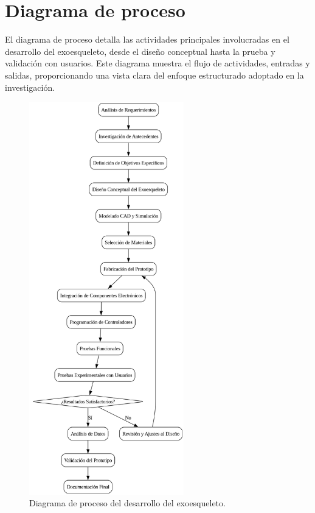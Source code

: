 \section{Diagrama de proceso}
El diagrama de proceso detalla las actividades principales involucradas en el desarrollo del exoesqueleto, desde el diseño conceptual hasta la prueba y validación con usuarios. Este diagrama muestra el flujo de actividades, entradas y salidas, proporcionando una vista clara del enfoque estructurado adoptado en la investigación.
\begin{figure}[H]
    \centering
    \includegraphics[width=0.6\textwidth]{img/Proceso.png}
    \caption{Diagrama de proceso del desarrollo del exoesqueleto.}
    \label{fig:flowchart2}
\end{figure}

